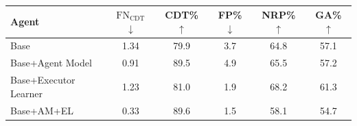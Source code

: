 \begin{table}[htbp]
\centering
\footnotesize
\begin{tabular}{l c c c c c}
\toprule
\textbf{Agent} & $\text{FN}_\text{CDT}$ $\downarrow$ & CDT\% $\uparrow$ & FP\% $\downarrow$ & NRP\% $\uparrow$ & GA\% $\uparrow$ \\
\midrule
Base                  & 1.34 & 79.9 & 3.7 & 64.8 & 57.1 \\
Base+Agent Model      & 0.91 & 89.5 & 4.9 & 65.5 & 57.2 \\
Base+Executor Learner & 1.23 & 81.0 & 1.9 & 68.2 & 61.3 \\
Base+AM+EL            & 0.33 & 89.6 & 1.5 & 58.1 & 54.7 \\
\bottomrule
\end{tabular}
\caption{}
\label{tab:unknown_systemic_results}
\end{table}
